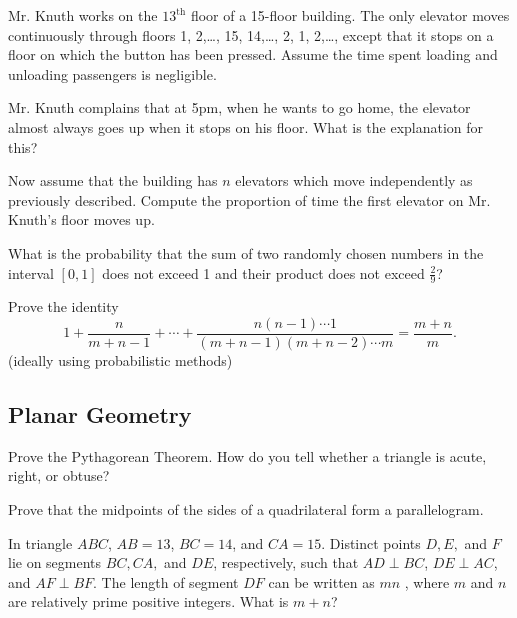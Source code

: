 \documentclass[12pt]{article}
\begin{document}
    \begin{exercise}
        Mr. Knuth works on the \(13^{\text{th}}\) floor of a 15-floor building.
        The only elevator moves continuously through floors 1, 2,\dots, 15, 14,\dots, 2, 1, 2,\dots, except that it stops on a floor on which the button has been pressed.
        Assume the time spent loading and unloading passengers is negligible.

        Mr. Knuth complains that at 5pm, when he wants to go home, the elevator almost always goes up when it stops on his floor.
        What is the explanation for this?

        Now assume that the building has \(n\) elevators which move independently as previously described.
        Compute the proportion of time the first elevator on Mr. Knuth's floor moves up.
    \end{exercise}
    
    \begin{exercise}
        What is the probability that the sum of two randomly chosen numbers in the interval \([0,1]\) does not exceed 1 and their product does not exceed \(\frac29\)?
    \end{exercise}

    \begin{exercise}
        Prove the identity
        \[1+\frac{n}{m+n-1}+\cdots+\frac{n(n-1)\cdots 1}{(m+n-1)(m+n-2)\cdots m}=\frac{m+n}{m}.\]
        (ideally using probabilistic methods)
    \end{exercise}

    \subsection{Planar Geometry}

        \begin{exercise}
            Prove the Pythagorean Theorem. How do you tell whether a triangle is acute, right, or obtuse?  
        \end{exercise}

        \begin{exercise}
            Prove that the midpoints of the sides of a quadrilateral form a parallelogram.
        \end{exercise}
        
        \begin{exercise}
            In triangle $ABC$, $AB = 13$, $BC = 14$, and $CA = 15$. Distinct points $D, E,$ and $F$ lie on segments $BC, CA,$ and $DE$, respectively, such that $AD \perp BC$, $DE \perp AC$, and $AF \perp BF$. The length of segment $DF$ can be written as $mn$ , where $m$ and $n$ are relatively prime positive integers. What is $m + n$?
        \end{exercise}
        
\end{document}
